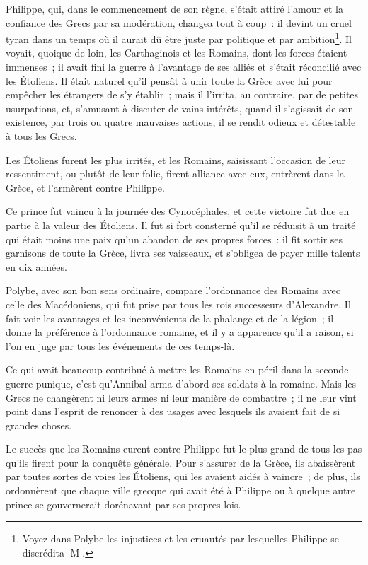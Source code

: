 \documentclass[french,twoside]{book} %
\begin{document}
Philippe, qui, dans le commencement de son règne, s’était attiré l’amour et la confiance des Grecs par sa modération, changea tout à coup : il devint un cruel tyran dans un temps où il aurait dû être juste par politique et par ambition\footnote{Voyez dans Polybe les injustices et les cruautés par lesquelles Philippe se discrédita [M].}. Il voyait, quoique de loin, les Carthaginois et les Romains, dont les forces étaient immenses ; il avait fini la guerre à l’avantage de ses alliés et s’était réconcilié avec les Étoliens. Il était naturel qu’il pensât à unir toute la Grèce avec lui pour empêcher les étrangers de s’y établir ; mais il l’irrita, au contraire, par de petites usurpations, et, s’amusant à discuter de vains intérêts, quand il s’agissait de son existence, par trois ou quatre mauvaises actions, il se rendit odieux et détestable à tous les Grecs.\par
Les Étoliens furent les plus irrités, et les Romains, saisissant l’occasion de leur ressentiment, ou plutôt de leur folie, firent alliance avec eux, entrèrent dans la Grèce, et l’armèrent contre Philippe.\par
Ce prince fut vaincu à la journée des Cynocéphales, et cette victoire fut due en partie à la valeur des Étoliens. Il fut si fort consterné qu’il se réduisit à un traité qui était moins une paix qu’un abandon de ses propres forces : il fit sortir ses garnisons de toute la Grèce, livra ses vaisseaux, et s’obligea de payer mille talents en dix années.\par
Polybe, avec son bon sens ordinaire, compare l’ordonnance des Romains avec celle des Macédoniens, qui fut prise par tous les rois successeurs d’Alexandre. Il fait voir les avantages et les inconvénients de la phalange et de la légion ; il donne la préférence à l’ordonnance romaine, et il y a apparence qu’il a raison, si l’on en juge par tous les événements de ces temps-là.\par
Ce qui avait beaucoup contribué à mettre les Romains en péril dans la seconde guerre punique, c’est qu’Annibal arma d’abord ses soldats à la romaine. Mais les Grecs ne changèrent ni leurs armes ni leur manière de combattre ; il ne leur vint point dans l’esprit de renoncer à des usages avec lesquels ils avaient fait de si grandes choses.\par
Le succès que les Romains eurent contre Philippe fut le plus grand de tous les pas qu’ils firent pour la conquête générale. Pour s’assurer de la Grèce, ils abaissèrent par toutes sortes de voies les Étoliens, qui les avaient aidés à vaincre ; de plus, ils ordonnèrent que chaque ville grecque qui avait été à Philippe ou à quelque autre prince se gouvernerait dorénavant par ses propres lois.\par
\end{document}
